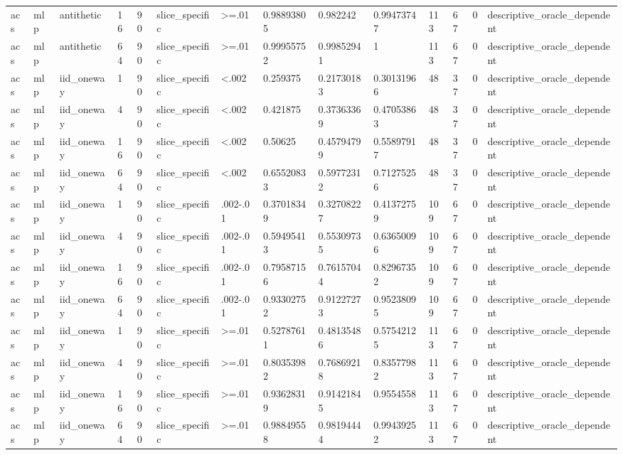 \begin{tabular}{llllllllllllll}
acs & mlp & antithetic & 16 & 90 & slice\_specific & >=.01 & 0.98893805 & 0.982242 & 0.99473747 & 113 & 67 & 0 & descriptive\_oracle\_dependent \\
acs & mlp & antithetic & 64 & 90 & slice\_specific & >=.01 & 0.99955752 & 0.99852941 & 1 & 113 & 67 & 0 & descriptive\_oracle\_dependent \\
acs & mlp & iid\_oneway & 1 & 90 & slice\_specific & <.002 & 0.259375 & 0.21730183 & 0.30131966 & 48 & 37 & 0 & descriptive\_oracle\_dependent \\
acs & mlp & iid\_oneway & 4 & 90 & slice\_specific & <.002 & 0.421875 & 0.37363369 & 0.47053863 & 48 & 37 & 0 & descriptive\_oracle\_dependent \\
acs & mlp & iid\_oneway & 16 & 90 & slice\_specific & <.002 & 0.50625 & 0.45794799 & 0.55897917 & 48 & 37 & 0 & descriptive\_oracle\_dependent \\
acs & mlp & iid\_oneway & 64 & 90 & slice\_specific & <.002 & 0.65520833 & 0.59772312 & 0.71275256 & 48 & 37 & 0 & descriptive\_oracle\_dependent \\
acs & mlp & iid\_oneway & 1 & 90 & slice\_specific & .002-.01 & 0.37018349 & 0.32708227 & 0.41372759 & 109 & 67 & 0 & descriptive\_oracle\_dependent \\
acs & mlp & iid\_oneway & 4 & 90 & slice\_specific & .002-.01 & 0.59495413 & 0.55309735 & 0.63650096 & 109 & 67 & 0 & descriptive\_oracle\_dependent \\
acs & mlp & iid\_oneway & 16 & 90 & slice\_specific & .002-.01 & 0.79587156 & 0.76157044 & 0.82967352 & 109 & 67 & 0 & descriptive\_oracle\_dependent \\
acs & mlp & iid\_oneway & 64 & 90 & slice\_specific & .002-.01 & 0.93302752 & 0.91227273 & 0.95238095 & 109 & 67 & 0 & descriptive\_oracle\_dependent \\
acs & mlp & iid\_oneway & 1 & 90 & slice\_specific & >=.01 & 0.52787611 & 0.48135486 & 0.57542125 & 113 & 67 & 0 & descriptive\_oracle\_dependent \\
acs & mlp & iid\_oneway & 4 & 90 & slice\_specific & >=.01 & 0.80353982 & 0.76869218 & 0.83577982 & 113 & 67 & 0 & descriptive\_oracle\_dependent \\
acs & mlp & iid\_oneway & 16 & 90 & slice\_specific & >=.01 & 0.93628319 & 0.91421845 & 0.9554558 & 113 & 67 & 0 & descriptive\_oracle\_dependent \\
acs & mlp & iid\_oneway & 64 & 90 & slice\_specific & >=.01 & 0.98849558 & 0.98194444 & 0.99439252 & 113 & 67 & 0 & descriptive\_oracle\_dependent \\

\end{tabular}
